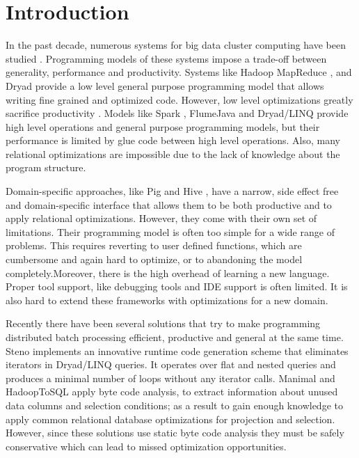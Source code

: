 \section{Introduction}
\label{sec:introduction}

In the past decade, numerous systems for big data cluster computing have been
studied \cite{dean_mapreduce:_2008, yu_dryadlinq:_2008-1, olston_pig_2008-1,
thusoo_hive_2010-1, spark-nsdi}. Programming models of these systems impose a
trade-off between generality, performance and productivity. Systems like Hadoop
MapReduce \cite{hadoop}, and Dryad \cite{isard_dryad:_2007} provide a low level
general purpose programming model that allows writing fine grained and optimized
code. However, low level optimizations greatly sacrifice productivity
\cite{chambers_flumejava:_2010}. Models like Spark \cite{spark-nsdi}, FlumeJava
\cite{chambers_flumejava:_2010} and Dryad/LINQ \cite{yu_dryadlinq:_2008-1}
provide high level operations and general purpose programming models, but their
performance is limited by glue code between high level operations. Also, many
relational optimizations are impossible due to the lack of knowledge about the
program structure.

Domain-specific approaches, like Pig \cite{olston_pig_2008-1} and Hive
\cite{thusoo_hive_2010-1}, have a narrow, side effect free and
domain-specific interface that allows them to be both productive and to apply relational optimizations.
However, they come with their own set of limitations. Their programming model is
often too simple for a wide range of problems. This requires reverting to user
defined functions, which are cumbersome and again hard to optimize, or to
abandoning the model completely.Moreover, there is the high overhead of learning
a new language.
Proper tool support, like debugging tools and IDE support is often limited. It
is also hard to extend these frameworks with optimizations for a new domain.

Recently there have been several solutions that try to make programming
distributed batch processing efficient, productive and general at the same time.
Steno \cite{murray_steno:_2011} implements an innovative runtime code generation
scheme that eliminates iterators in Dryad/LINQ queries. It operates over flat
and nested queries and produces a minimal number of loops without any iterator
calls. Manimal \cite{jahani_automatic_2011} and HadoopToSQL
\cite{iu_hadooptosql:_2010} apply byte code analysis, to extract information
about unused data columns and selection conditions; as a result to gain enough
knowledge to apply common relational database optimizations for projection and
selection. However, since these solutions use static byte code analysis they
must be safely conservative which can lead to missed optimization opportunities.

